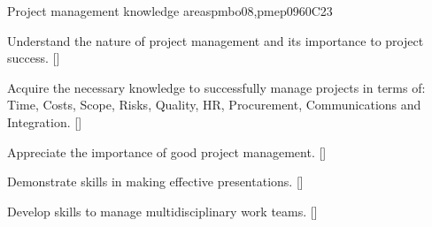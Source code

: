\begin{syllabus}
\begin{unit}{Project management knowledge areas}{}{pmbo08,pmep09}{60}{C23}
   \begin{learningoutcomes}
      \item Understand the nature of project management and its importance to project success. [\Assessment]
      \item Acquire the necessary knowledge to successfully manage projects in terms of: Time, Costs, Scope, Risks, Quality, HR, Procurement, Communications and Integration. [\Usage]
      \item Appreciate the importance of good project management. [\Assessment]
      \item Demonstrate skills in making effective presentations. [\Usage]
      \item Develop skills to manage multidisciplinary work teams. [\Usage]
   \end{learningoutcomes}
\end{unit}


\begin{coursebibliography}
\end{coursebibliography}

\end{syllabus}
